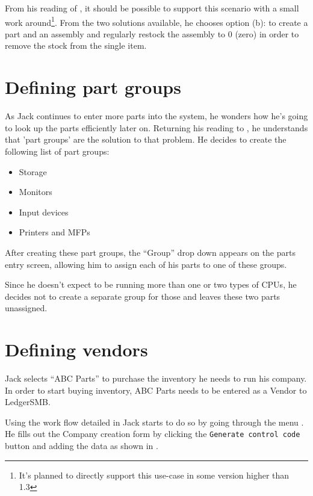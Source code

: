 From his reading of , it should be
possible to support this scenario with a small work around\footnote{It's planned to directly
support this use-case in some version higher than 1.3}. From the two solutions available,
he chooses option (b): to create a part and an assembly and regularly restock the assembly
to 0 (zero) in order to remove the stock from the single item.

\section{Defining part groups}
\label{sec-stock-part-groups}

As Jack continues to enter more parts into the system, he wonders how he's going to
look up the parts efficiently later on. Returning his reading to ,
he understands that 'part groups' are the solution to that problem. He decides to create
the following list of part groups:

\begin{itemize}
\item Storage
\item Monitors
\item Input devices
\item Printers and MFPs
\end{itemize}

After creating these part groups, the ``Group'' drop down appears on the parts entry screen,
allowing him to assign each of his parts to one of these groups.

Since he doesn't expect to be running more than one or two types of CPUs, he decides
not to create a separate group for those and leaves these two parts unassigned.

\section{Defining vendors}
\label{sec-stock-defining-vendors}

Jack selects ``ABC Parts'' to purchase the inventory he needs to run his company. In
order to start buying inventory, ABC Parts needs to be entered as a Vendor to LedgerSMB.

Using the work flow detailed in  Jack starts to do so by going through the menu .
 He fills out the Company creation form by clicking the {\tt Generate control code}
button and adding the data as shown in .


